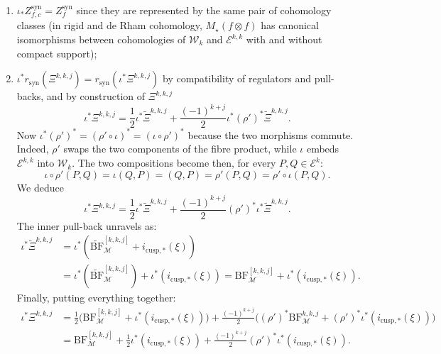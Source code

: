 \documentclass[11pt, a4paper, reqno]{amsart}
\theoremstyle{definition}
\theoremstyle{plain}
\theoremstyle{remark}
\DeclareMathOperator{\syn}{syn}
\DeclareMathOperator{\mot}{\mathscr{M}}
\newcommand{\Ell}{\mathcal{E}}
\newcommand{\KS}{\mathscr{W}}
\newcommand{\BF}{\mathrm{BF}}
\newcommand{\lBF}{\widetilde{\mathrm{BF}}}
\newcommand{\lcBF}{\widetilde{\Xi}}
\newcommand{\cBF}{\Xi}
\newcommand{\regulator}[1]{r_{#1}}
\newcommand{\rsyn}{\regulator{\syn}}
\begin{document}
   \begin{enumerate}
       \item $\iota_* Z_{f,c}^{\syn} = Z_f^{\syn}$ since they are represented by the same pair of cohomology classes (in rigid and de Rham cohomology, $M_{\star}(f\otimes f)$ has canonical isomorphisms between cohomologies of $\KS_k$ and $\Ell^{k,k}$ with and without compact support);
       \item $\iota^*\rsyn(\cBF^{k,k,j}) = \rsyn(\iota^*\cBF^{k,k,j})$ by compatibility of regulators and pull-backs, and by construction of $\cBF^{k,k,j}$
           \[
               \iota^*\cBF^{k,k,j} = \frac{1}{2}\iota^*\lcBF^{k,k,j} + \frac{(-1)^{k+j}}{2}\iota^*(\rho')^*\lcBF^{k,k,j}.
           \]
           Now $\iota^*(\rho')^* = (\rho'\circ \iota)^* = (\iota\circ \rho')^*$ because the two morphisms commute. Indeed, $\rho'$ swaps the two components of the fibre product, while $\iota$ embeds $\Ell^{k,k}$ into $\KS_k$. The two compositions become then, for every $P,Q\in\Ell^k$:
           \[
            \iota\circ\rho'(P,Q) = \iota(Q,P) = (Q,P) = \rho'(P,Q) = \rho'\circ \iota(P,Q).
           \]
           We deduce
           \[
               \iota^*\cBF^{k,k,j} = \frac{1}{2}\iota^*\lcBF^{k,k,j} + \frac{(-1)^{k+j}}{2}(\rho')^*\iota^*\lcBF^{k,k,j}.
           \]
           The inner pull-back unravels as:
           \begin{equation}
               \label{eq:pull-back-lcbf}
               \begin{split}
                   \iota^* \lcBF^{k,k,j} &= \iota^*(\lBF^{[k,k,j]}_{\mot} + i_{\mathrm{cusp},*}(\xi)) \\
                   &= \iota^*(\lBF^{[k,k,j]}_{\mot}) + \iota^*(i_{\mathrm{cusp},*}(\xi)) = \BF^{[k,k,j]}_{\mot} + \iota^*(i_{\mathrm{cusp},*}(\xi)).
               \end{split}
           \end{equation}
           Finally, putting everything together:
           \begin{equation}
               \label{eq:pull-back-cbf}
               \begin{split}
                   \iota^* \cBF^{k,k,j} &= \frac{1}{2}\bigl(\BF^{[k,k,j]}_{\mot} + \iota^*(i_{\mathrm{cusp},*}(\xi))\bigr) + \frac{(-1)^{k+j}}{2}\bigl((\rho')^*\BF^{k,k,j}_{\mot} + (\rho')^*\iota^*(i_{\mathrm{cusp},*}(\xi))\bigr) \\
                   &= \BF^{[k,k,j]}_{\mot} + \frac{1}{2}\iota^*(i_{\mathrm{cusp},*}(\xi)) + \frac{(-1)^{k+j}}{2}(\rho')^*\iota^*(i_{\mathrm{cusp},*}(\xi)).
               \end{split}
           \end{equation}
   \end{enumerate}
\end{document}

